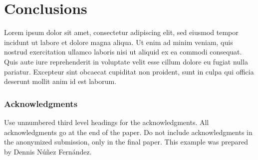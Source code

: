 \documentclass{article}
\begin{document}
\section{Conclusions}

Lorem ipsum dolor sit amet, consectetur adipiscing elit, sed eiusmod tempor incidunt ut labore et dolore magna aliqua. Ut enim ad minim veniam, quis nostrud exercitation ullamco laboris nisi ut aliquid ex ea commodi consequat. Quis aute iure reprehenderit in voluptate velit esse cillum dolore eu fugiat nulla pariatur. Excepteur sint obcaecat cupiditat non proident, sunt in culpa qui officia deserunt mollit anim id est laborum.


\subsubsection*{Acknowledgments}

Use unnumbered third level headings for the acknowledgments. All acknowledgments go at the end of the paper. Do not include acknowledgments in the anonymized submission, only in the final paper. This example was prepared by Dennis Núñez Fernández.


{}

\end{document}
